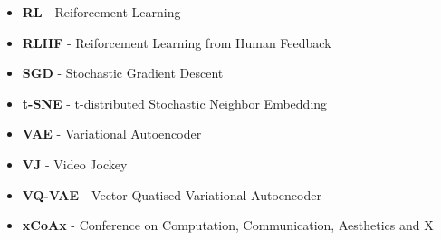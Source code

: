 \begin{itemize}
\item \textbf{RL} - Reiforcement Learning
\item \textbf{RLHF} - Reiforcement Learning from Human Feedback
\item \textbf{SGD} - Stochastic Gradient Descent
\item \textbf{t-SNE} - t-distributed Stochastic Neighbor Embedding
\item \textbf{VAE} - Variational Autoencoder
\item \textbf{VJ} - Video Jockey
\item \textbf{VQ-VAE} - Vector-Quatised Variational Autoencoder
\item \textbf{xCoAx} - Conference on Computation, Communication, Aesthetics and X
\end{itemize}